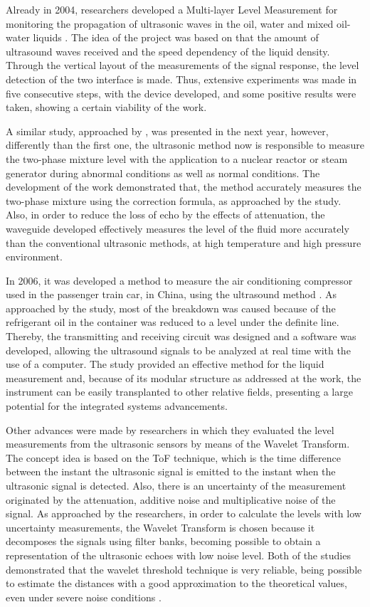Already in 2004, researchers developed a Multi-layer Level Measurement for monitoring the propagation of ultrasonic waves in the oil, water and mixed oil-water liquids \cite{MERIBOUT:2004}. The idea of the project was based on that the amount of ultrasound waves received and the speed dependency of the liquid density. Through the vertical layout of the measurements of the signal response, the level detection of the two interface is made. Thus, extensive experiments was made in five consecutive steps, with the device developed, and some positive results were taken, showing a certain viability of the work. 

A similar study, approached by \cite{LEE:2005}, was presented in the next year, however, differently than the first one, the ultrasonic method now is responsible to measure the two-phase mixture level with the application to a nuclear reactor or steam generator during abnormal conditions as well as normal conditions. The development of the work demonstrated that, the method accurately measures the two-phase mixture using the correction formula, as approached by the study. Also, in order to reduce the loss of echo by the effects of attenuation, the waveguide developed effectively measures the level of the fluid more accurately than the conventional ultrasonic methods, at high temperature and high pressure environment.

In 2006, it was developed a method to measure the air conditioning compressor used in the passenger train car, in China, using the ultrasound method \cite{CHEN:2006}. As approached by the study, most of the breakdown was caused because of the refrigerant oil in the container was reduced to a level under the definite line. Thereby, the transmitting and receiving circuit was designed and a software was developed, allowing the ultrasound signals to be analyzed at real time with the use of a computer. The study provided an effective method for the liquid measurement and, because of its modular structure as addressed at the work, the instrument can be easily transplanted to other relative fields, presenting a large potential for the integrated systems advancements.

Other advances were made by researchers in which they evaluated the level measurements from the ultrasonic sensors by means of the Wavelet Transform. The concept idea is based on the \gls{ToF} technique, which is the time difference between the instant the ultrasonic signal is emitted to the instant when the ultrasonic signal is detected. Also, there is an uncertainty of the measurement originated by the attenuation, additive noise and multiplicative noise of the signal. As approached by the researchers, in order to calculate the levels with low uncertainty measurements, the Wavelet Transform is chosen because it decomposes the signals using filter banks, becoming possible to obtain a representation of the ultrasonic echoes with low noise level. Both of the studies demonstrated that the wavelet threshold technique is very reliable, being possible to estimate the distances with a good approximation to the theoretical values, even under severe noise conditions \cite{INGAROCA:2011, GRASSI:2014}.  

